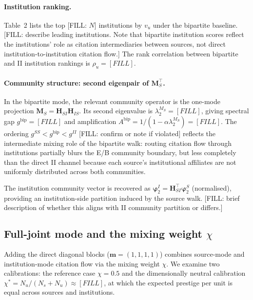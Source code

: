 \paragraph{Institution ranking.}
Table~2 lists the top [FILL: $N$] institutions by $v_u$ under the
bipartite baseline.
[FILL: describe leading institutions. Note that bipartite institution
scores reflect the institutions' role as citation intermediaries between
sources, not direct institution-to-institution citation flow.]
The rank correlation between bipartite and II institution rankings is
$\rho_u=[FILL]$.

\paragraph{Community structure: second eigenpair of $\mathbf{M}_S^\top$.}
In the bipartite mode, the relevant community operator is the one-mode
projection $\mathbf{M}_S=\mathbf{H}_{SI}\mathbf{H}_{IS}$.
Its second eigenvalue is $\lambda_2^{M_S}=[FILL]$, giving spectral gap
$g^{\mathrm{bip}}=[FILL]$ and amplification
$A^{\mathrm{bip}}=1/(1-\alpha\lambda_2^{M_S})=[FILL]$.
The ordering $g^{SS}<g^{\mathrm{bip}}<g^{II}$ [FILL: confirm or note
if violated] reflects the intermediate mixing role of the bipartite walk:
routing citation flow through institutions partially blurs the E/B
community boundary, but less completely than the direct II channel
because each source's institutional affiliates are not uniformly
distributed across both communities.

The institution community vector is recovered as
$\boldsymbol{\varphi}_2^I=\mathbf{H}_{SI}^\top\boldsymbol{\varphi}_2^S$
(normalised), providing an institution-side partition induced by the
source walk. [FILL: brief description of whether this aligns with II
community partition or differs.]

\subsection{Full-joint mode and the mixing weight $\chi$}
\label{sec:results_full}

Adding the direct diagonal blocks ($\mathbf{m}=(1,1,1,1)$) combines
source-mode and institution-mode citation flow via the mixing weight
$\chi$. We examine two calibrations: the reference case $\chi=0.5$
and the dimensionally neutral calibration
$\chi^*=N_u/(N_s+N_u)\approx[FILL]$, at which the expected
prestige per unit is equal across sources and institutions.

